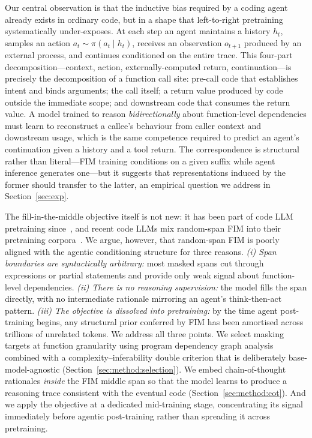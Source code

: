 Our central observation is that the inductive bias required by a coding
agent already exists in ordinary code, but in a shape that left-to-right
pretraining systematically under-exposes. At each step an agent maintains a
history $h_t$, samples an action $a_t \sim \pi(a_t \mid h_t)$, receives an
observation $o_{t+1}$ produced by an external process, and continues
conditioned on the entire trace. This four-part decomposition---context,
action, externally-computed return, continuation---is precisely the
decomposition of a function call site: pre-call code that establishes intent
and binds arguments; the call itself; a return value produced by code
outside the immediate scope; and downstream code that consumes the return
value. A model trained to reason \emph{bidirectionally} about function-level
dependencies must learn to reconstruct a callee's behaviour from caller
context and downstream usage, which is the same competence required to
predict an agent's continuation given a history and a tool return. The
correspondence is structural rather than literal---FIM training conditions
on a given suffix while agent inference generates one---but it suggests
that representations induced by the former should transfer to the latter,
an empirical question we address in Section~\ref{sec:exp}.

The fill-in-the-middle objective itself is not new: it has been part of code
LLM pretraining since~\citet{bavarian2022fim}, and recent code LLMs mix
random-span FIM into their pretraining
corpora~\citep{qwencoder, deepseekcoder, starcoder}. We
argue, however, that random-span FIM is poorly aligned with the agentic
conditioning structure for three reasons. \emph{(i) Span boundaries are
syntactically arbitrary:} most masked spans cut through expressions or
partial statements and provide only weak signal about function-level
dependencies. \emph{(ii) There is no reasoning supervision:} the model
fills the span directly, with no intermediate rationale mirroring an
agent's think-then-act pattern. \emph{(iii) The objective is dissolved
into pretraining:} by the time agent post-training begins, any structural
prior conferred by FIM has been amortised across trillions of unrelated
tokens. We address all three points. We select masking targets at function
granularity using program dependency graph analysis combined with a
complexity--inferability double criterion that is deliberately
base-model-agnostic (Section~\ref{sec:method:selection}). We embed
chain-of-thought rationales \emph{inside} the FIM middle span so that the
model learns to produce a reasoning trace consistent with the eventual
code (Section~\ref{sec:method:cot}). And we apply the objective at a
dedicated mid-training stage, concentrating its signal immediately before
agentic post-training rather than spreading it across pretraining.

